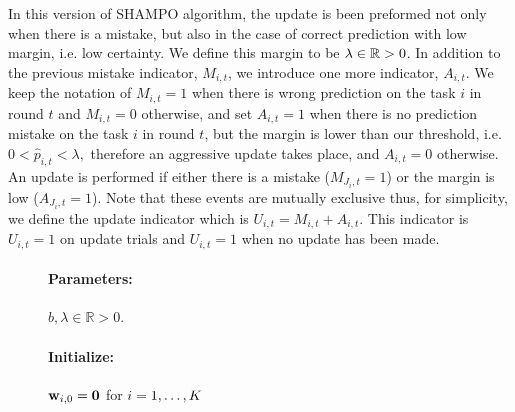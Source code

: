 {In this  version of SHAMPO algorithm, the update is been preformed not only when there is a mistake, 
but also in the case of correct prediction with low margin, i.e. low certainty. We define this margin to be
$\lambda \in\mathbb{R}>0$. In addition to the previous mistake indicator, $M_{i,t}$,  we introduce one more 
indicator,  $A_{i,t}$. We keep the notation of  $M_{i,t}=1$ when there is wrong prediction on the task $i$
in round $t$ and $M_{i,t}=0$ otherwise, and set $A_{i,t}=1$ when there is no prediction mistake on the task 
$i$ in round $t$, but the margin is lower than our threshold, i.e. $0<\hat{p}_{i,t}<\lambda,$ therefore an
aggressive update takes place, and $A_{i,t}=0$  otherwise. 
An update is performed if either there is a mistake ($M_{J_i,t}=1$) or the margin is
low ($A_{J_i,t}=1$). Note that these events are mutually exclusive thus, for simplicity, we define the update
indicator which is  $U_{i,t}=M_{i,t}+A_{i,t}$. This indicator is  $U_{i,t}=1$ on update trials and  $U_{i,t}=1$
when no update has been made.

\label{sec:FO_aggressive_alg}
\begin{figure}[h]
\paragraph{Parameters:}$b, \lambda \in\mathbb{R}>0$.
\paragraph{Initialize:} $\mathbf{w}_{i,0}={\boldsymbol{0}}$ for $i=1, \ldots , K$

\end{figure}}

